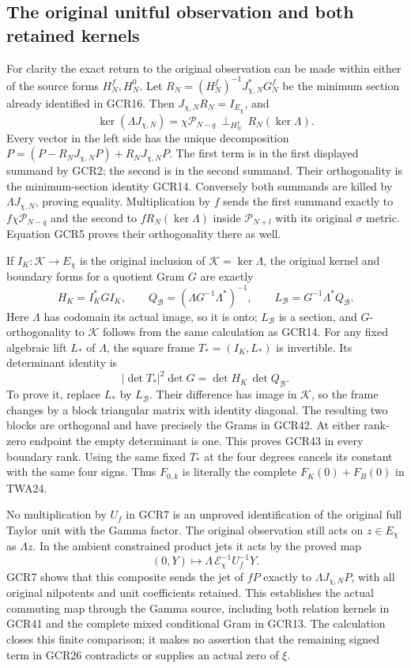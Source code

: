 \documentclass[11pt,a4paper]{article}
\begin{document}
\subsection{The original unitful observation and both retained kernels}

For clarity the exact return to the original observation can be
made within either of the source forms $H_N^f,H_N^0$.
Let $R_N=(H_N^f)^{-1}J_{\chi,N}^*G_N^f$ be the minimum
section already identified in GCR16. Then
$J_{\chi,N}R_N=I_{E_\chi}$, and
\[
 \ker(\Lambda J_{\chi,N})
       =\chi\mathcal P_{N-q}\ \mathbin{\perp_{H_N^f}}\
                                  R_N(\ker\Lambda).
\tag{GCR41}
\]
Every vector in the left side has the unique decomposition
$P=(P-R_NJ_{\chi,N}P)+R_NJ_{\chi,N}P$.
The first term is in the first displayed summand by GCR2;
the second is in the second summand. Their orthogonality is
the minimum-section identity GCR14. Conversely both summands
are killed by $\Lambda J_{\chi,N}$, proving equality.
Multiplication by $f$ sends the first summand exactly to
$f\chi\mathcal P_{N-q}$ and the second to $fR_N(\ker\Lambda)$
inside $\mathcal P_{N+l}$ with its original $\sigma$ metric.
Equation GCR5 proves their orthogonality there as well.

If $I_K:\mathcal K\to E_\chi$ is the original inclusion
of $\mathcal K=\ker\Lambda$, the original kernel and boundary
forms for a quotient Gram $G$ are exactly
\[
 H_K=I_K^*GI_K,\qquad
 Q_{\mathcal B}=(\Lambda G^{-1}\Lambda^*)^{-1},\qquad
 L_{\mathcal B}=G^{-1}\Lambda^*Q_{\mathcal B}.
\tag{GCR42}
\]
Here $\Lambda$ has codomain its actual image, so it is onto;
$L_{\mathcal B}$ is a section, and $G$-orthogonality to
$\mathcal K$ follows from the same calculation as GCR14.
For any fixed algebraic lift $L_*$ of $\Lambda$, the square
frame $T_*=(I_K,L_*)$ is invertible. Its determinant identity is
\[
 |\det T_*|^2\det G
       =\det H_K\,\det Q_{\mathcal B}.
\tag{GCR43}
\]
To prove it, replace $L_*$ by $L_{\mathcal B}$.
Their difference has image in $\mathcal K$, so the frame
changes by a block triangular matrix with identity diagonal.
The resulting two blocks are orthogonal and have precisely
the Grams in GCR42. At either rank-zero endpoint the empty
determinant is one. This proves GCR43 in every boundary rank.
Using the same fixed $T_*$ at the four degrees cancels its
constant with the same four signs. Thus $F_{0,k}$ is literally
the complete $F_K(0)+F_B(0)$ in TWA24.

No multiplication by $U_f$ in GCR7 is an unproved identification
of the original full Taylor unit with the Gamma factor.
The original observation still acts on $z\in E_\chi$ as
$\Lambda z$. In the ambient constrained product jets it acts
by the proved map
\[
 (0,Y)\longmapsto
       \Lambda\,\mathcal E_\chi^{-1}U_f^{-1}Y.
\tag{GCR44}
\]
GCR7 shows that this composite sends the jet of $fP$ exactly
to $\Lambda J_{\chi,N}P$, with all original nilpotents and
unit coefficients retained. This establishes the actual
commuting map through the Gamma source, including both
relation kernels in GCR41 and the complete mixed conditional
Gram in GCR13. The calculation closes this finite comparison;
it makes no assertion that the remaining signed term in
GCR26 contradicts or supplies an actual zero of $\xi$.
\end{document}
